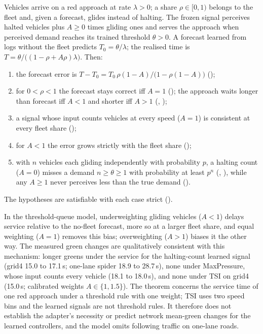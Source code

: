 \begin{theorem}\label{thm:queue}
Vehicles arrive on a red approach at rate $\lambda>0$; a share $\rho\in[0,1)$ belongs to the fleet and, given a forecast, glides instead of
halting. The frozen signal perceives halted vehicles plus $A\ge0$ times gliding ones and serves the approach when perceived demand reaches
its trained threshold $\theta>0$. A forecast learned from logs without the fleet predicts $T_0=\theta/\lambda$; the realised time is
$T=\theta/\big((1-\rho+A\rho)\lambda\big)$. Then:
\begin{enumerate}\setlength\itemsep{0pt}
\item the forecast error is $T-T_0=T_0\,\rho(1-A)/\big(1-\rho(1-A)\big)$ ();
\item for $0<\rho<1$ the forecast stays correct iff $A=1$ (); the approach waits longer than forecast iff $A<1$ and
shorter iff $A>1$ (, );
\item a signal whose input counts vehicles at every speed ($A=1$) is consistent at every fleet share ();
\item for $A<1$ the error grows strictly with the fleet share ();
\item with $n$ vehicles each gliding independently with probability $p$, a halting count ($A=0$) misses a demand $n\ge\theta\ge1$ with
probability at least $p^n$ (, ), while any $A\ge1$ never perceives less than the true demand
().
\end{enumerate}
The hypotheses are satisfiable with each case strict ().
\end{theorem}
In the threshold-queue model, underweighting gliding vehicles ($A<1$) delays service relative to the no-fleet forecast, more so at a
larger fleet share, and equal weighting ($A=1$) removes this bias; overweighting ($A>1$) biases it the other way. The measured green
changes are qualitatively consistent with this mechanism: longer greens under the service for the halting-count learned signal (grid4
15.0 to 17.1\,s; one-lane spider 18.9 to 28.7\,s), none under MaxPressure, whose input counts every vehicle (18.1 to 18.0\,s), and none
under TSI on grid4 (15.0\,s; calibrated weights $A\in\{1,1.5\}$). The theorem concerns the service time of one red approach under a
threshold rule with one weight; TSI uses two speed bins and the learned signals are not threshold rules. It therefore does not establish
the adapter's necessity or predict network mean-green changes for the learned controllers, and the model omits following traffic on
one-lane roads.

